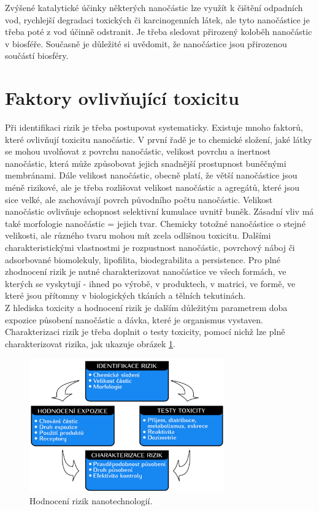 Zvýšené katalytické účinky některých nanočástic lze využít k čištění odpadních vod, rychlejší degradaci toxických či karcinogenních látek, ale tyto nanočástice je třeba poté z vod účinně odstranit. Je třeba sledovat přirozený koloběh nanočástic v biosféře. Současně je důležité si uvědomit, že nanočástice jsou přirozenou součástí biosféry. 


\section{Faktory ovlivňující toxicitu}

Při identifikaci rizik je třeba postupovat systematicky. Existuje mnoho faktorů, které ovlivňují toxicitu nanočástic. V první řadě je to chemické složení, jaké látky se mohou uvolňovat z povrchu nanočástic, velikost povrchu a inertnost nanočástic, která může způsobovat jejich snadnější prostupnost buněčnými membránami. Dále velikost nanočástic, obecně platí, že větší nanočástice jsou méně rizikové, ale je třeba rozlišovat velikost nanočástic a agregátů, které jsou sice velké, ale zachovávají povrch původního počtu nanočástic. Velikost nanočástic ovlivňuje schopnost selektivní kumulace uvnitř buněk. Zásadní vliv má také morfologie nanočástic = jejich tvar. Chemicky totožné nanočástice o stejné velikosti, ale různého tvaru mohou mít zcela odlišnou toxicitu. Dalšími charakteristickými vlastnostmi je rozpustnost nanočástic, povrchový náboj či adsorbované biomolekuly, lipofilita, biodegrabilita a persistence. Pro plné zhodnocení rizik je nutné charakterizovat nanočástice ve všech formách, ve kterých se vyskytují -  ihned po výrobě, v produktech, v matrici, ve formě, ve které jsou přítomny v biologických tkáních a tělních tekutinách. \\

Z hlediska toxicity a hodnocení rizik je dalším důležitým parametrem doba expozice působení nanočástic a dávka, které je organismus vystaven. Charakterizaci rizik je třeba doplnit o testy toxicity, pomocí nichž lze plně charakterizovat rizika, jak ukazuje obrázek \ref{fig:hodnoceni_rizika}.

    \begin{figure}[h]
        \centering
        \includegraphics[width=0.75\textwidth]{pictures/hodnoceni_rizik.png}
        \caption{Hodnocení rizik nanotechnologií. \cite{filipova2012}}
        \label{fig:hodnoceni_rizika}
    \end{figure}

